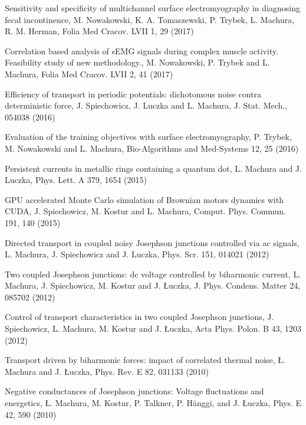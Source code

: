 \documentclass[11pt,a4paper,sans]{moderncv} %
\begin{document}
\begin{etaremune}
\item Sensitivity and specificity of multichannel surface electromyography in diagnosing fecal incontinence, M. Nowakowski, K. A. Tomaszewski, P. Trybek, L. Machura, R. M. Herman, Folia Med Cracov. LVII 1,  29 (2017)

\item Correlation based analysis of sEMG signals during complex muscle activity. Feasibility study of new methodology., M. Nowakowski, P. Trybek and L. Machura, Folia Med Cracov. LVII 2,  41 (2017)

\item Efficiency of transport in periodic potentials: dichotomous noise contra deterministic force, J. Spiechowicz,  J. Luczka and L. Machura, J. Stat. Mech.,  054038 (2016)

\item Evaluation of the training objectives with surface electromyography, P. Trybek, M. Nowakowski and L. Machura, Bio-Algorithms and Med-Systems 12,  25 (2016)

\item Persistent currents in metallic rings containing a quantum dot, L. Machura and J. Luczka, Phys. Lett. A 379,  1654 (2015)

\item GPU accelerated Monte Carlo simulation of Brownian motors dynamics with CUDA, J. Spiechowicz, M. Kostur and L. Machura, Comput. Phys. Commun. 191,  140 (2015)

\item Directed transport in coupled noisy Josephson junctions controlled via ac signals, L. Machura, J. Spiechowicz and J. Luczka, Phys. Scr. 151,  014021 (2012)

\item Two coupled Josephson junctions: dc voltage controlled by biharmonic current, L. Machura, J. Spiechowicz, M. Kostur and J. Łuczka, J. Phys. Condens. Matter 24,  085702 (2012)

\item Control of transport characteristics in two coupled Josephson junctions, J. Spiechowicz, L. Machura, M. Kostur and J. Łuczka, Acta Phys. Polon. B 43,  1203 (2012)

\item Transport driven by biharmonic forces: impact of correlated thermal noise, Ł. Machura and J. Łuczka, Phys. Rev. E 82,  031133 (2010)

\item Negative conductances of Josephson junctions: Voltage fluctuations and energetics, Ł. Machura, M. Kostur, P. Talkner, P. Hänggi, and J. Łuczka, Phys. E 42,  590 (2010)


\end{etaremune}
\end{document}
